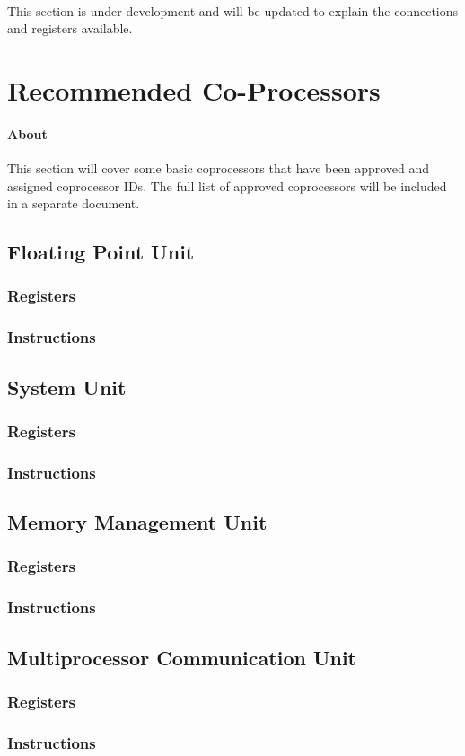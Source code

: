 \documentclass[letterpaper, 11pt]{article}
\begin{document}
\paragraph{}This section is under development and will be updated to explain the connections and registers available.

\section{Recommended Co-Processors}
\paragraph{About} This section will cover some basic coprocessors that have been approved and assigned coprocessor IDs. The full list of approved coprocessors will be included in a separate document. 
\subsection{Floating Point Unit}
\subsubsection{Registers}
\subsubsection{Instructions}
\subsection{System Unit}
\subsubsection{Registers}
\subsubsection{Instructions}
\subsection{Memory Management Unit}
\subsubsection{Registers}
\subsubsection{Instructions}
\subsection{Multiprocessor Communication Unit}
\subsubsection{Registers}
\subsubsection{Instructions}
\end{document}
